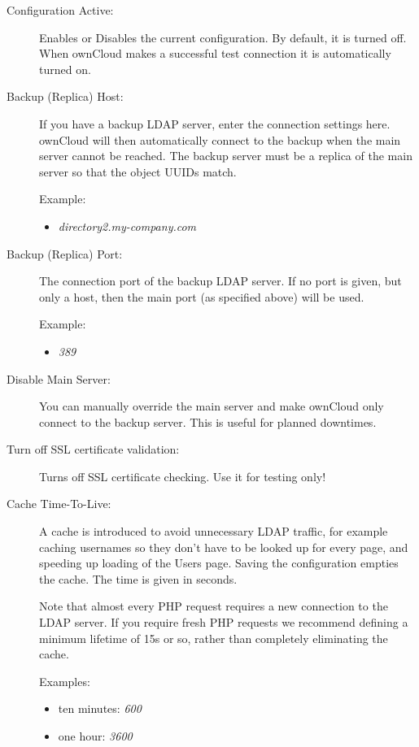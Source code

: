 \documentclass[letterpaper,10pt,english]{sphinxmanual}
\begin{document}
\begin{description}
\item[{Configuration Active:}] \leavevmode
Enables or Disables the current configuration. By default, it is turned off.
When ownCloud makes a successful test connection it is automatically turned
on.

\item[{Backup (Replica) Host:}] \leavevmode
If you have a backup LDAP server, enter the connection settings here.
ownCloud will then automatically connect to the backup when the main server
cannot be reached. The backup server must be a replica of the main server so
that the object UUIDs match.

Example:
\begin{itemize}
\item {} 
\emph{directory2.my-company.com}

\end{itemize}

\item[{Backup (Replica) Port:}] \leavevmode
The connection port of the backup LDAP server. If no port is given,
but only a host, then the main port (as specified above) will be used.

Example:
\begin{itemize}
\item {} 
\emph{389}

\end{itemize}

\item[{Disable Main Server:}] \leavevmode
You can manually override the main server and make ownCloud only connect to
the backup server. This is useful for planned downtimes.

\item[{Turn off SSL certificate validation:}] \leavevmode
Turns off SSL certificate checking. Use it for testing only!

\item[{Cache Time-To-Live:}] \leavevmode
A cache is introduced to avoid unnecessary LDAP traffic, for example caching
usernames so they don't have to be looked up for every page, and speeding up
loading of the Users page. Saving the configuration empties the cache. The
time is given in seconds.

Note that almost every PHP request requires a new connection to the LDAP
server. If you require fresh PHP requests we recommend defining a minimum
lifetime of 15s or so, rather than completely eliminating the cache.

Examples:
\begin{itemize}
\item {} 
ten minutes: \emph{600}

\item {} 
one hour: \emph{3600}

\end{itemize}

\end{description}
\end{document}
